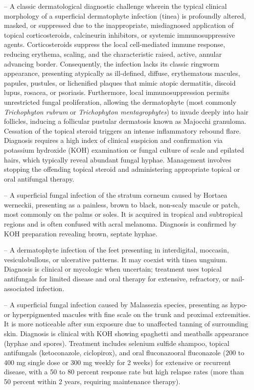 -- A classic dermatological diagnostic challenge wherein the typical clinical morphology of a superficial dermatophyte infection (tinea) is profoundly altered, masked, or suppressed due to the inappropriate, misdiagnosed application of topical corticosteroids, calcineurin inhibitors, or systemic immunosuppressive agents. Corticosteroids suppress the local cell-mediated immune response, reducing erythema, scaling, and the characteristic raised, active, annular advancing border. Consequently, the infection lacks its classic ringworm appearance, presenting atypically as ill-defined, diffuse, erythematous macules, papules, pustules, or lichenified plaques that mimic atopic dermatitis, discoid lupus, rosacea, or psoriasis. Furthermore, local immunosuppression permits unrestricted fungal proliferation, allowing the dermatophyte (most commonly \textit{Trichophyton rubrum} or \textit{Trichophyton mentagrophytes}) to invade deeply into hair follicles, inducing a follicular pustular dermatosis known as Majocchi granuloma. Cessation of the topical steroid triggers an intense inflammatory rebound flare. Diagnosis requires a high index of clinical suspicion and confirmation via potassium hydroxide (KOH) examination or fungal culture of scale and epilated hairs, which typically reveal abundant fungal hyphae. Management involves stopping the offending topical steroid and administering appropriate topical or oral antifungal therapy.

-- A superficial fungal infection of the stratum corneum caused by Hortaea werneckii, presenting as a painless, brown to black, non-scaly macule or patch, most commonly on the palms or soles. It is acquired in tropical and subtropical regions and is often confused with acral melanoma. Diagnosis is confirmed by KOH preparation revealing brown, septate hyphae.

-- A dermatophyte infection of the feet presenting in interdigital, moccasin, vesiculobullous, or ulcerative patterns. It may coexist with tinea unguium. Diagnosis is clinical or mycologic when uncertain; treatment uses topical antifungals for limited disease and oral therapy for extensive, refractory, or nail-associated infection.

-- A superficial fungal infection caused by Malassezia species, presenting as hypo- or hyperpigmented macules with fine scale on the trunk and proximal extremities. It is more noticeable after sun exposure due to unaffected tanning of surrounding skin. Diagnosis is clinical with KOH showing spaghetti and meatballs appearance (hyphae and spores). Treatment includes selenium sulfide shampoo, topical antifungals (ketoconazole, ciclopirox), and oral fluconazooral fluconazole (200 to 400 mg single dose or 300 mg weekly for 2 weeks) for extensive or recurrent disease, with a 50 to 80 percent response rate but high relapse rates (more than 50 percent within 2 years, requiring maintenance therapy).

